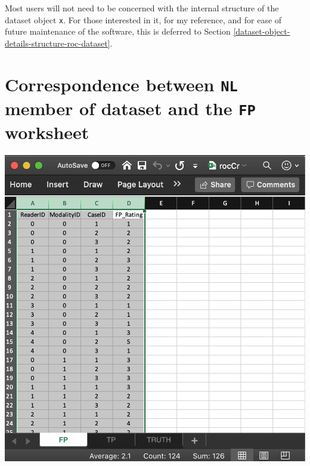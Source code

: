 \documentclass[
]{book}
\begin{document}
Most users will not need to be concerned with the internal structure of the dataset object \texttt{x}. For those interested in it, for my reference, and for ease of future maintenance of the software, this is deferred to Section \ref{dataset-object-details-structure-roc-dataset}.

\hypertarget{quick-start-read-datafile-correspondence-nl-fp}{%
\section{\texorpdfstring{Correspondence between \texttt{NL} member of dataset and the \texttt{FP} worksheet}{Correspondence between NL member of dataset and the FP worksheet}}\label{quick-start-read-datafile-correspondence-nl-fp}}

\includegraphics[width=1\textwidth,height=\textheight]{images/quick-start/rocCrFp.png}
\end{document}

